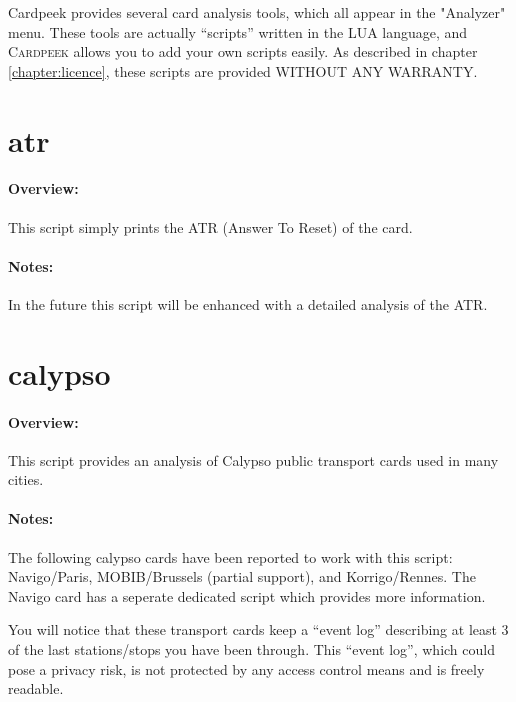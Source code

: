 \documentclass[11pt]{report}
\newcommand{\Cardpeek}{\textsc{Cardpeek}}
\begin{document}
Cardpeek provides several card analysis tools, which all appear in the "Analyzer" menu. 
These tools are actually ``scripts'' written in the LUA language, and \Cardpeek{} allows you to 
add your own scripts easily.
As described in chapter \ref{chapter:licence}, these scripts are provided WITHOUT ANY WARRANTY.

\section{atr}

\paragraph{Overview:}
This script simply prints the ATR (Answer To Reset) of the card.

\paragraph{Notes:}
In the future this script will be enhanced with a detailed analysis of the ATR.

\section{calypso}

\paragraph{Overview:}
This script provides an analysis of Calypso public transport cards used in many cities.

\paragraph{Notes:}
The following calypso cards have been reported to work with this script: Navigo/Paris,
MOBIB/Brussels (partial support), and Korrigo/Rennes. The Navigo card has a seperate dedicated
script which provides more information.

You will notice that these transport cards keep a ``event log'' describing at 
least 3 of the last stations/stops you have been through.
This ``event log'', which could pose a privacy risk, is not protected by any access 
control means and is freely readable.

\end{document}
